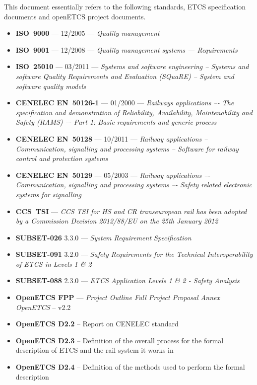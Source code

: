\documentclass{template/openetcs_report}
\begin{document}
This document essentially refers to the following standards, ETCS specification documents and openETCS project documents.

\begin{itemize}
\item \textbf{ISO~9000} --- 12/2005 --- \emph{Quality management}
\item \textbf{ISO~9001} --- 12/2008 --- \emph{Quality management systems — Requirements}
\item \textbf{ISO~25010} --- 03/2011 --- \emph{Systems and software engineering -- Systems and software Quality Requirements and Evaluation (SQuaRE) -- System and software quality models}
\item \textbf{CENELEC EN~50126-1} --- 01/2000 --- \emph{Railways applications –- The specification and 
demonstration of Reliability, Availability, Maintenability and Safety (RAMS) –- Part 1: 
Basic requirements and generic process}
\item \textbf{CENELEC EN~50128} --- 10/2011 --- \emph{Railway applications -- Communication, signalling and 
processing systems -- Software for railway control and protection systems}
\item \textbf{CENELEC EN~50129} --- 05/2003 --- \emph{Railway applications –- Communication, signalling and 
processing systems –- Safety related electronic systems for signalling}
\item \textbf{CCS~TSI} --- \emph{ CCS TSI for HS and CR transeuropean rail has been adopted by a Commission Decision 2012/88/EU on the 25th January 2012}
\item \textbf{SUBSET-026} 3.3.0 --- \emph{System Requirement Specification}
\item \textbf{SUBSET-091} 3.2.0 --- \emph{Safety Requirements for the Technical Interoperability
of ETCS in Levels 1 \& 2}
\item \textbf{SUBSET-088} 2.3.0 --- \emph{ETCS Application Levels 1 \& 2 - Safety Analysis}
\item \textbf{OpenETCS FPP} --- \emph{Project Outline Full Project Proposal Annex OpenETCS} -- v2.2
\item \textbf{OpenETCS D2.2} -- Report on CENELEC standard
\item \textbf{OpenETCS D2.3} -- Definition of the overall process for the formal description of ETCS and the rail system it works in 
\item \textbf{OpenETCS D2.4} -- Definition of the methods used to perform the formal description
\end{itemize}
\end{document}
